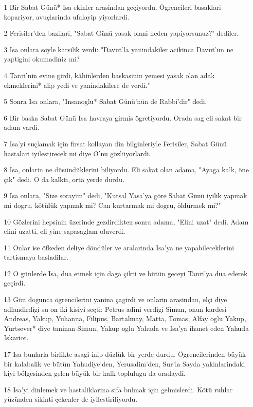 \par 1 Bir Sabat Günü* Isa ekinler arasindan geçiyordu. Ögrencileri basaklari kopariyor, avuçlarinda ufalayip yiyorlardi.
\par 2 Ferisiler'den bazilari, "Sabat Günü yasak olani neden yapiyorsunuz?" dediler.
\par 3 Isa onlara söyle karsilik verdi: "Davut'la yanindakiler acikinca Davut'un ne yaptigini okumadiniz mi?
\par 4 Tanri'nin evine girdi, kâhinlerden baskasinin yemesi yasak olan adak ekmeklerini* alip yedi ve yanindakilere de verdi."
\par 5 Sonra Isa onlara, "Insanoglu* Sabat Günü'nün de Rabbi'dir" dedi.
\par 6 Bir baska Sabat Günü Isa havraya girmis ögretiyordu. Orada sag eli sakat bir adam vardi.
\par 7 Isa'yi suçlamak için firsat kollayan din bilginleriyle Ferisiler, Sabat Günü hastalari iyilestirecek mi diye O'nu gözlüyorlardi.
\par 8 Isa, onlarin ne düsündüklerini biliyordu. Eli sakat olan adama, "Ayaga kalk, öne çik" dedi. O da kalkti, orta yerde durdu.
\par 9 Isa onlara, "Size sorayim" dedi, "Kutsal Yasa'ya göre Sabat Günü iyilik yapmak mi dogru, kötülük yapmak mi? Can kurtarmak mi dogru, öldürmek mi?"
\par 10 Gözlerini hepsinin üzerinde gezdirdikten sonra adama, "Elini uzat" dedi. Adam elini uzatti, eli yine sapasaglam oluverdi.
\par 11 Onlar ise öfkeden deliye döndüler ve aralarinda Isa'ya ne yapabileceklerini tartismaya basladilar.
\par 12 O günlerde Isa, dua etmek için daga çikti ve bütün geceyi Tanri'ya dua ederek geçirdi.
\par 13 Gün dogunca ögrencilerini yanina çagirdi ve onlarin arasindan, elçi diye adlandirdigi su on iki kisiyi seçti: Petrus adini verdigi Simun, onun kardesi Andreas, Yakup, Yuhanna, Filipus, Bartalmay, Matta, Tomas, Alfay oglu Yakup, Yurtsever* diye taninan Simun, Yakup oglu Yahuda ve Isa'ya ihanet eden Yahuda Iskariot.
\par 17 Isa bunlarla birlikte asagi inip düzlük bir yerde durdu. Ögrencilerinden büyük bir kalabalik ve bütün Yahudiye'den, Yerusalim'den, Sur'la Sayda yakinlarindaki kiyi bölgesinden gelen büyük bir halk toplulugu da oradaydi.
\par 18 Isa'yi dinlemek ve hastaliklarina sifa bulmak için gelmislerdi. Kötü ruhlar yüzünden sikinti çekenler de iyilestiriliyordu.
